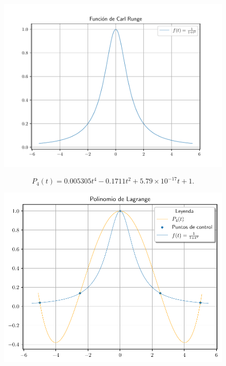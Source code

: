 \begin{frame}
    \begin{solution}
        \begin{figure}[ht!]
            \centering
            \includegraphics[width=.72\paperwidth]{p12}
        \end{figure}
    \end{solution}
\end{frame}

\begin{frame}
    \begin{solution}
        \begin{equation*}
            P_{4}\left(t\right)=
            0.005305t^{4}-
            0.1711t^{2}+
            5.79\times 10^{-17}t+
            1.
        \end{equation*}
        \begin{figure}[ht!]
            \centering
            \includegraphics[width=.5\paperwidth]{p12_lagrange5}
        \end{figure}
    \end{solution}
\end{frame}

